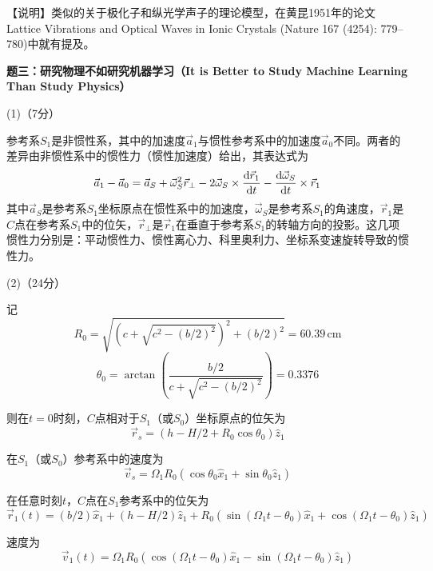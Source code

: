 \documentclass[10pt,a4paper,onecolumn,UTF8]{ctexart}
\begin{document}
	【说明】类似的关于极化子和纵光学声子的理论模型，在黄昆1951年的论文Lattice Vibrations and Optical Waves in Ionic Crystals (Nature 167 (4254): 779–780)中就有提及。
	
	
	
	\setcounter{equation}{0}
	\newpage

	\noindent
	\textbf{题三：研究物理不如研究机器学习（It is Better to Study Machine Learning Than Study Physics）}
	
	(1)（7分）
	
	参考系$S_1$是非惯性系，其中的加速度$\vec a_1$与惯性参考系中的加速度$\vec a_0$不同。两者的差异由非惯性系中的惯性力（惯性加速度）给出，其表达式为
	\begin{equation}\label{E3-01}
		\vec a_1-\vec a_0=\vec a_S+\vec\omega_S^2\vec r_{\perp}-2\vec\omega_S\times\frac{\mathrm{d} \vec r_1}{\mathrm{d} t}-\frac{\mathrm{d} \vec\omega_S}{\mathrm{d} t}\times\vec r_1
	\end{equation}
	其中$\vec a_S$是参考系$S_1$坐标原点在惯性系中的加速度，$\vec\omega_S$是参考系$S_1$的角速度，$\vec r_1$是$C$点在参考系$S_1$中的位矢，$\vec r_{\perp}$是$\vec r_1$在垂直于参考系$S_1$的转轴方向的投影。这几项惯性力分别是：平动惯性力、惯性离心力、科里奥利力、坐标系变速旋转导致的惯性力。
	
	(2)（24分）
	
	记
	$$R_0=\sqrt{\left(c+\sqrt{c^2-\left(b/2\right)^2}\right)^2+(b/2)^2}=60.39\,\text{cm}$$
	$$\theta_0=\arctan\left(\frac{b/2}{c+\sqrt{c^2-\left(b/2\right)^2}}\right)=0.3376$$
	
	则在$t=0$时刻，$C$点相对于$S_1$（或$S_0$）坐标原点的位矢为
	\begin{equation}\label{E3-02}
		\vec r_s=\left(h-H/2+R_0\cos\theta_0\right)\hat z_1
	\end{equation}
	
	在$S_1$（或$S_0$）参考系中的速度为
	\begin{equation}\label{E3-03}
		\vec v_s=\Omega_1R_0\left(\cos\theta_0\hat x_1+\sin\theta_0\hat z_1\right)
	\end{equation}	
	
	在任意时刻$t$，$C$点在$S_1$参考系中的位矢为
	\begin{equation}\label{E3-04}
		\vec r_1(t)=(b/2)\hat x_1+(h-H/2)\hat z_1+R_0\left(\sin(\Omega_1t-\theta_0)\hat x_1+\cos(\Omega_1t-\theta_0)\hat z_1\right)
	\end{equation}
	
	速度为
	\begin{equation}
		\vec v_1(t)=\Omega_1R_0\left(\cos(\Omega_1t-\theta_0)\hat x_1-\sin(\Omega_1t-\theta_0)\hat z_1\right)
	\end{equation}
	
\end{document}
